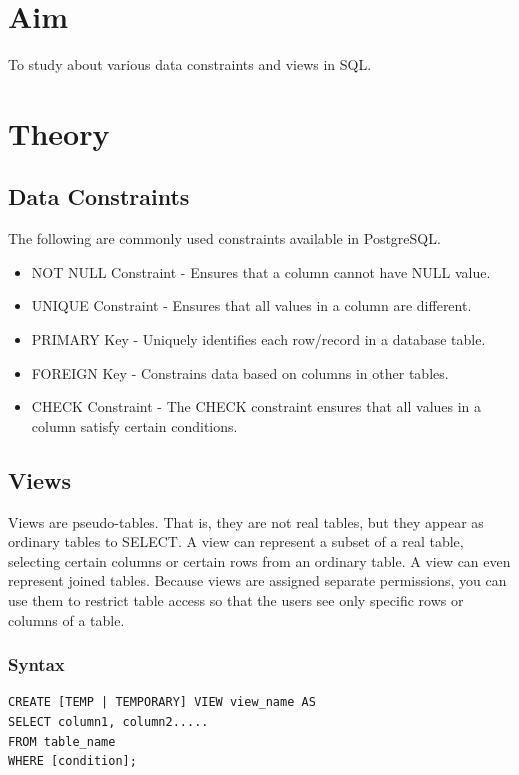 \section{Aim}
 To study about various data constraints and views in SQL.

\section{{Theory}}

\subsection{Data Constraints}

The following are commonly used constraints available in PostgreSQL.
\begin{itemize}
    \item NOT NULL Constraint - Ensures that a column cannot have NULL value.
    \item UNIQUE Constraint - Ensures that all values in a column are different.
    \item PRIMARY Key - Uniquely identifies each row/record in a database table.
    \item FOREIGN Key - Constrains data based on columns in other tables.
    \item CHECK Constraint - The CHECK constraint ensures that all values in a column satisfy certain conditions.
\end{itemize}

\subsection{Views}

Views are pseudo-tables. That is, they are not real tables, but they appear as ordinary tables to SELECT. A view can represent a subset of a real table, selecting certain columns or certain rows from an ordinary table. A view can even represent joined tables. Because views are assigned separate permissions, you can use them to restrict table access so that the users see only specific rows or columns of a table.

\subsubsection{Syntax}

\begin{verbatim}
CREATE [TEMP | TEMPORARY] VIEW view_name AS
SELECT column1, column2.....
FROM table_name
WHERE [condition];
\end{verbatim}

